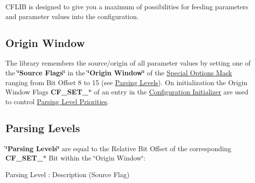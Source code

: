 CFLIB is designed to give you a maximum of possibilities for feeding parameters and parameter values into the configuration.\hypertarget{config_levels_origin_window}{}\subsection{Origin Window}\label{config_levels_origin_window}
The library remembers the source/origin of all parameter values by setting one of the {\bf \char`\"{}Source Flags\char`\"{}} in the {\bf \char`\"{}Origin Window\char`\"{}} of the \hyperlink{group__special__options__mask}{Special Options Mask} ranging from Bit Offset 8 to 15 (see \hyperlink{config_levels_parsing_levels}{Parsing Levels}). On initialization the Origin Window Flags {\bf CF\_\-SET\_\-$\ast$} of an entry in the \hyperlink{config_initializer}{Configuration Initializer} are used to control \hyperlink{config_levels_parsing_level_priorities}{Parsing Level Priorities}.\hypertarget{config_levels_parsing_levels}{}\subsection{Parsing Levels}\label{config_levels_parsing_levels}
{\bf \char`\"{}Parsing Levels\char`\"{}} are equal to the Relative Bit Offset of the corresponding {\bf CF\_\-SET\_\-$\ast$} Bit within the \char`\"{}Origin Window\char`\"{}:

Parsing Level : Description (Source Flag)

